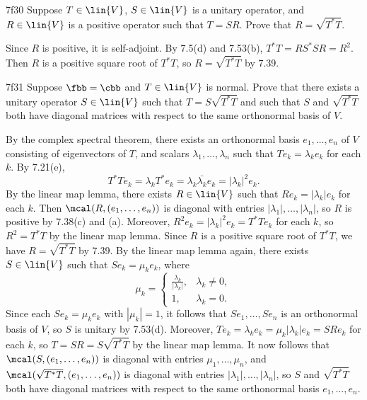 \begin{exercise}{7f30}
    Suppose $T \in \lin{V}$, $S \in \lin{V}$ is a unitary operator, and $R \in \lin{V}$ is a positive operator such that $T = SR$.
    Prove that $R = \sqrt{T^\ast T}$.

\end{exercise}

\begin{sol}
    Since $R$ is positive, it is self-adjoint.
    By 7.5(d) and 7.53(b), $T^\ast T = RS^\ast SR = R^2$.
    Then $R$ is a positive square root of $T^\ast T$, so $R = \sqrt{T^\ast T}$ by 7.39.
\end{sol}

\begin{exercise}{7f31}
    Suppose $\fbb = \cbb$ and $T \in \lin{V}$ is normal.
    Prove that there exists a unitary operator $S \in \lin{V}$ such that $T = S\sqrt{T^\ast T}$ and such that $S$ and $\sqrt{T^\ast T}$ both have diagonal matrices with respect to the same orthonormal basis of $V$.
\end{exercise}

\begin{sol}
    By the complex spectral theorem, there exists an orthonormal basis $e_1, \ldots, e_n$ of $V$ consisting of eigenvectors of $T$, and scalars $\lambda_1, \ldots, \lambda_n$ such that $T e_k = \lambda_k e_k$ for each $k$.
    By 7.21(e),
    \[
        T^\ast T e_k = \lambda_k T^\ast e_k = \lambda_k \bar{\lambda_k} e_k = |\lambda_k|^2 e_k.
    \]
    By the linear map lemma, there exists $R \in \lin{V}$ such that $R e_k = |\lambda_k| e_k$ for each $k$.
    Then $\mcal(R, (e_1, \ldots, e_n))$ is diagonal with entries $|\lambda_1|, \ldots, |\lambda_n|$, so $R$ is positive by 7.38(c) and (a).
    Moreover, $R^2 e_k = |\lambda_k|^2 e_k = T^\ast T e_k$ for each $k$, so $R^2 = T^\ast T$ by the linear map lemma.
    Since $R$ is a positive square root of $T^\ast T$, we have $R = \sqrt{T^\ast T}$ by 7.39.
    By the linear map lemma again, there exists $S \in \lin{V}$ such that $S e_k = \mu_k e_k$, where
    \[
        \mu_k = 
        \begin{cases}
            \frac{\lambda_k}{|\lambda_k|}, & \lambda_k \neq 0, \\
            1, & \lambda_k = 0.
        \end{cases}
    \]
    Since each $S e_k = \mu_k e_k$ with $|\mu_k| = 1$, it follows that $S e_1, \ldots, S e_n$ is an orthonormal basis of $V$, so $S$ is unitary by 7.53(d).
    Moreover, $T e_k = \lambda_k e_k = \mu_k |\lambda_k| e_k = S R e_k$ for each $k$, so $T = S R = S \sqrt{T^\ast T}$ by the linear map lemma.
    It now follows that $\mcal(S, (e_1, \ldots, e_n))$ is diagonal with entries $\mu_1, \ldots, \mu_n$, and $\mcal(\sqrt{T^\ast T}, (e_1, \ldots, e_n))$ is diagonal with entries $|\lambda_1|, \ldots, |\lambda_n|$, so $S$ and $\sqrt{T^\ast T}$ both have diagonal matrices with respect to the same orthonormal basis $e_1, \ldots, e_n$.
\end{sol}

